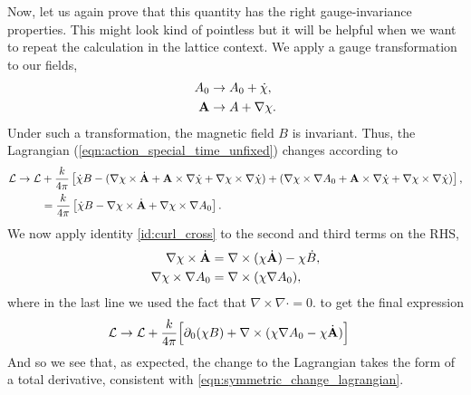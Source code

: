\documentclass[11pt, oneside]{article} %
\numberwithin{equation}{section}
\begin{document}
Now, let us again prove that this quantity has the right gauge-invariance properties. This might look kind of pointless but it will be helpful when we want to repeat the calculation in the lattice context. We apply a gauge transformation to our fields,
\begin{align}
    A_0 &\rightarrow A_0 + \dot \chi, \\
    \textbf A & \rightarrow A + \nabla \chi.
\end{align}
Under such a transformation, the magnetic field $B$ is invariant. Thus, the Lagrangian (\cref{eqn:action_special_time_unfixed}) changes according to
\begin{align}
    \mathcal L \rightarrow \mathcal L  &+ 
    \frac{k}{4\pi} \left [  
    \dot \chi  B 
    - (\nabla \chi \times \dot {\textbf A} 
    + \textbf A \times \nabla \dot \chi 
    + \nabla\chi \times \nabla \dot \chi)
    + (\nabla \chi \times \nabla A_0
    + \textbf A \times \nabla \dot \chi
    + \nabla \chi \times \nabla \dot \chi)
    \right ], \\
    & = 
    \frac{k}{4\pi} \left [  
    \dot \chi  B 
    - \nabla \chi \times \dot {\textbf A} 
    + \nabla \chi \times \nabla A_0
    \right ].\label{eqn:cont_intermediate_gauge}
\end{align}
We now apply identity \ref{id:curl_cross} to the second and third terms on the RHS,
\begin{align}
    \nabla \chi \times \dot {\textbf A} &= \nabla \times (\chi \dot{\textbf A}) - \chi \dot B, \\
    \nabla \chi \times \nabla  A_0 &= \nabla \times (\chi \nabla  A_0),
\end{align}
where in the last line we used the fact that $\nabla \times \nabla \cdot  = 0$. to get the final expression
\begin{align}
    \mathcal L \rightarrow \mathcal L  &+ \frac{k}{4\pi}
    \Big [
    \partial_0 (\chi B) + \nabla \times (\chi\nabla A_0 - \chi\dot {\textbf A})
    \Big ]
\end{align}
And so we see that, as expected, the change to the Lagrangian takes the form of a total derivative, consistent with \cref{eqn:symmetric_change_lagrangian}.
\end{document}
